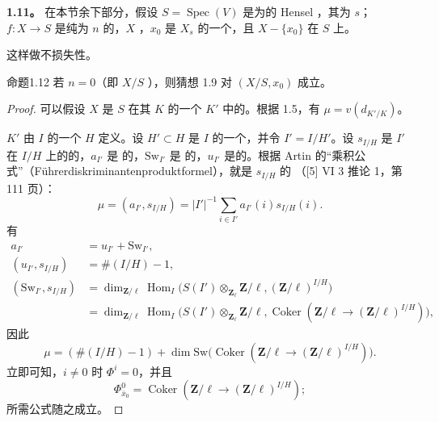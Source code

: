 \textbf{1.11。} 在本节余下部分，假设 $S=\operatorname{Spec}(V)$ 是为的 Hensel ，其为 $s$；$f:X\to S$ 是纯为 $n$ 的，$X$ ，$x_0$ 是 $X_s$ 的一个，且 $X-\{x_0\}$ 在 $S$ 上。

这样做不损失性。

\begin{SGAresult}{命题}{1.12}
若 $n=0$（即 $X/S$ ），则猜想 1.9 对 $(X/S,x_0)$ 成立。
\end{SGAresult}
\begin{proof}
可以假设 $X$ 是 $S$ 在其 $K$ 的一个 $K'$ 中的。根据 1.5，有 $\mu=v(d_{K'/K})$。

 $K'$ 由 $I$ 的一个 $H$ 定义。设 $H'\subset H$ 是 $I$ 的一个，并令 $I'=I/H'$。设 $s_{I/H}$ 是 $I'$ 在 $I/H$ 上的的，$a_{I'}$ 是 的，$\mathrm{Sw}_{I'}$ 是 的，$u_{I'}$ 是的。根据 Artin 的“乘积公式”（Führerdiskriminantenproduktformel），就是 $s_{I/H}$ 的 （[5] VI 3 推论 1，第 111 页）：
\[
\mu=(a_{I'},s_{I/H})=|I'|^{-1}\sum_{i\in I'}a_{I'}(i)s_{I/H}(i).
\]
有
\[
\begin{aligned}
a_{I'}&=u_{I'}+\mathrm{Sw}_{I'},\\
(u_{I'},s_{I/H})&=\#(I/H)-1,\\
(\mathrm{Sw}_{I'},s_{I/H})
&=\dim_{\mathbf Z/\ell}\operatorname{Hom}_I
\bigl(S(I')\otimes_{\mathbf Z_\ell}\mathbf Z/\ell,(\mathbf Z/\ell)^{I/H}\bigr)\\
&=\dim_{\mathbf Z/\ell}\operatorname{Hom}_I
\bigl(S(I')\otimes_{\mathbf Z_\ell}\mathbf Z/\ell,
\operatorname{Coker}(\mathbf Z/\ell\to(\mathbf Z/\ell)^{I/H})\bigr),
\end{aligned}
\]
因此
\[
\mu=(\#(I/H)-1)+\dim\mathrm{Sw}\bigl(\operatorname{Coker}(\mathbf Z/\ell\to(\mathbf Z/\ell)^{I/H})\bigr).
\]
立即可知，$i\ne0$ 时 $\Phi^i=0$，并且
\[
\Phi^0_{\bar x_0}=\operatorname{Coker}(\mathbf Z/\ell\to(\mathbf Z/\ell)^{I/H});
\]
所需公式随之成立。
\end{proof}

